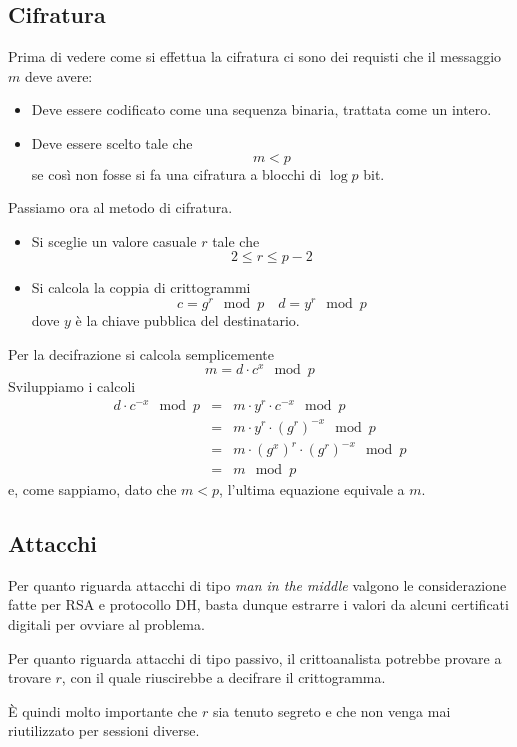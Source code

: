 \subsection{Cifratura}
Prima di vedere come si effettua la cifratura ci sono dei requisti che il messaggio $m$ deve avere:
\begin{itemize}
	\item Deve essere codificato come una sequenza binaria, trattata come un intero.
	\item Deve essere scelto tale che
	      \[ m < p \]
	      se cos\`i non fosse si fa una cifratura a blocchi di $\log p$ bit.
\end{itemize}
Passiamo ora al metodo di cifratura.
\begin{itemize}
	\item Si sceglie un valore casuale $r$ tale che
	      \[ 2 \leq r \leq p - 2 \]
	\item Si calcola la coppia di crittogrammi
	      \[ c = g^r \mod{p} \quad d = y^r \mod{p} \]
	      dove $y$ \`e la chiave pubblica del destinatario.
\end{itemize}
Per la decifrazione si calcola semplicemente
\[ m = d \cdot c^x \mod{p} \]
Sviluppiamo i calcoli
\[
	\begin{matrix}
		d \cdot c^{-x} \mod{p} & = & m \cdot y^r \cdot c^{-x} \mod{p}         \\
		                       & = & m \cdot y^r \cdot (g^r)^{-x} \mod{p}     \\
		                       & = & m \cdot (g^x)^r \cdot (g^r)^{-x} \mod{p} \\
		                       & = & m \mod{p}
	\end{matrix}
\]
e, come sappiamo, dato che $m < p$, l'ultima equazione equivale a $m$.

\subsection{Attacchi}
Per quanto riguarda attacchi di tipo \emph{man in the middle} valgono le considerazione fatte per RSA e protocollo
DH, basta dunque estrarre i valori da alcuni certificati digitali per ovviare al problema.

Per quanto riguarda attacchi di tipo passivo, il crittoanalista potrebbe provare a trovare $r$, con il quale
riuscirebbe a decifrare il crittogramma.

\`E quindi molto importante che $r$ sia tenuto segreto e che non venga mai riutilizzato per sessioni diverse.

